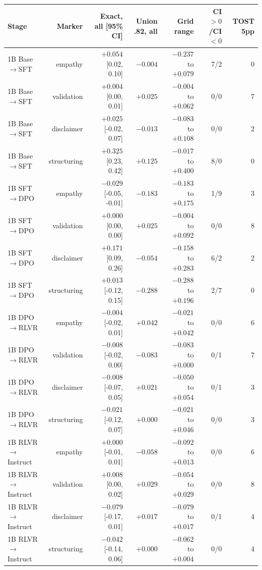\begin{tabular}{lrrrrrr}
\toprule
Stage & Marker & Exact, all [95\% CI] & Union .82, all & Grid range & CI$>0$/CI$<0$ & TOST 5pp \\
\midrule
1B Base$\to$SFT & empathy & $+0.054$ [0.02, 0.10] & $-0.004$ & $-0.237$ to $+0.079$ & 7/2 & 0 \\
1B Base$\to$SFT & validation & $+0.004$ [0.00, 0.01] & $+0.025$ & $-0.004$ to $+0.062$ & 0/0 & 7 \\
1B Base$\to$SFT & disclaimer & $+0.025$ [-0.02, 0.07] & $-0.013$ & $-0.083$ to $+0.108$ & 0/0 & 2 \\
1B Base$\to$SFT & structuring & $+0.325$ [0.23, 0.42] & $+0.125$ & $-0.017$ to $+0.400$ & 8/0 & 0 \\
1B SFT$\to$DPO & empathy & $-0.029$ [-0.05, -0.01] & $-0.183$ & $-0.183$ to $+0.175$ & 1/9 & 3 \\
1B SFT$\to$DPO & validation & $+0.000$ [0.00, 0.00] & $+0.025$ & $-0.004$ to $+0.092$ & 0/0 & 8 \\
1B SFT$\to$DPO & disclaimer & $+0.171$ [0.09, 0.26] & $-0.054$ & $-0.158$ to $+0.283$ & 6/2 & 2 \\
1B SFT$\to$DPO & structuring & $+0.013$ [-0.12, 0.15] & $-0.288$ & $-0.288$ to $+0.196$ & 2/7 & 0 \\
1B DPO$\to$RLVR & empathy & $-0.004$ [-0.02, 0.01] & $+0.042$ & $-0.021$ to $+0.042$ & 0/0 & 6 \\
1B DPO$\to$RLVR & validation & $-0.008$ [-0.02, 0.00] & $-0.083$ & $-0.083$ to $+0.000$ & 0/1 & 7 \\
1B DPO$\to$RLVR & disclaimer & $-0.008$ [-0.07, 0.05] & $+0.021$ & $-0.050$ to $+0.054$ & 0/1 & 3 \\
1B DPO$\to$RLVR & structuring & $-0.021$ [-0.12, 0.07] & $+0.000$ & $-0.021$ to $+0.046$ & 0/0 & 3 \\
1B RLVR$\to$Instruct & empathy & $+0.000$ [-0.01, 0.01] & $-0.058$ & $-0.092$ to $+0.013$ & 0/0 & 6 \\
1B RLVR$\to$Instruct & validation & $+0.008$ [0.00, 0.02] & $+0.029$ & $-0.054$ to $+0.029$ & 0/0 & 8 \\
1B RLVR$\to$Instruct & disclaimer & $-0.079$ [-0.17, 0.01] & $+0.017$ & $-0.079$ to $+0.017$ & 0/1 & 4 \\
1B RLVR$\to$Instruct & structuring & $-0.042$ [-0.14, 0.06] & $+0.000$ & $-0.062$ to $+0.004$ & 0/0 & 4 \\

\end{tabular}
